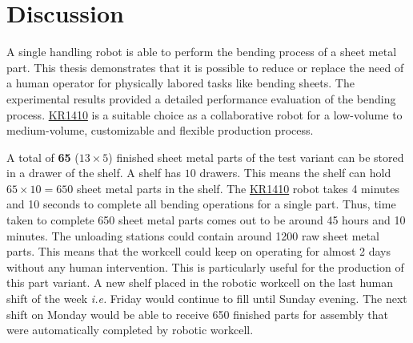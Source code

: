 \chapter{Discussion}
\label{chap:discussion}
A single handling robot is able to perform the bending process of a sheet metal part. This thesis demonstrates that it is possible to reduce or replace the need of a human operator for physically labored tasks like bending sheets. The experimental results provided a detailed performance evaluation of the bending process. \hyperref[acro:KR]{KR1410} is a suitable choice as a collaborative robot for a low-volume to medium-volume, customizable and flexible production process.

A total of \textbf{65} ($13 \times 5$) finished sheet metal parts of the test variant can be stored in a drawer of the shelf. A shelf has $10$ drawers. This means the shelf can hold $65 \times 10 = 650$ sheet metal parts in the shelf. The \hyperref[acro:KR]{KR1410} robot takes 4 minutes and 10 seconds to complete all bending operations for a single part. Thus, time taken to complete 650 sheet metal parts comes out to be around 45 hours and 10 minutes.
The unloading stations could contain around 1200 raw sheet metal parts. This means that the workcell could keep on operating for almost 2 days without any human intervention. This is particularly useful for the production of this part variant. A new shelf placed in the robotic workcell on the last human shift of the week \textit{i.e.} Friday would continue to fill until Sunday evening. The next shift on Monday would be able to receive 650 finished parts for assembly that were automatically completed by robotic workcell.

